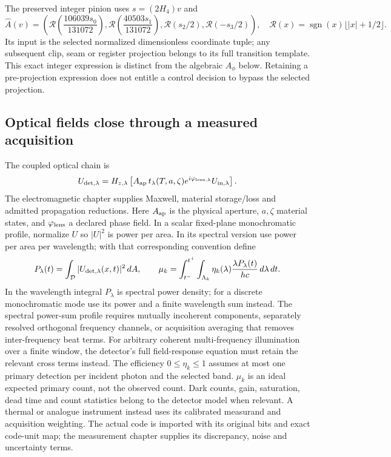 The preserved integer pinion uses $s=(2H_4)v$ and
\begin{equation}
 \widehat A(v)=\left(
 \mathcal R\!\left(\frac{106039s_0}{131072}\right),
 \mathcal R\!\left(\frac{40503s_1}{131072}\right),
 \mathcal R(s_2/2),\mathcal R(-s_3/2)\right),
 \quad \mathcal R(x)=\operatorname{sgn}(x)\lfloor|x|+1/2\rfloor.
 \label{eq:r14-integer-pinion}
\end{equation}
Its input is the selected normalized dimensionless coordinate tuple; any
subsequent clip, seam or register projection belongs to its full transition
template. This exact integer expression is distinct from the algebraic
$A_\phi$ below. Retaining a pre-projection expression does not entitle a control
decision to bypass the selected projection.

\subsection{Optical fields close through a measured acquisition}
\label{sec:r14-optical-observation}
The coupled optical chain is
\begin{equation}
 U_{\rm det,\lambda}=H_{z,\lambda}
 \left[A_{\rm ap}\,t_\lambda(T,a,\zeta)
 e^{i\varphi_{\rm lens,\lambda}}U_{\rm in,\lambda}\right].
 \label{eq:r14-optical-chain}
\end{equation}
The electromagnetic chapter supplies Maxwell, material storage/loss and
admitted propagation reductions. Here $A_{\rm ap}$ is the physical aperture,
$a,\zeta$ material states, and $\varphi_{\rm lens}$ a declared phase field.
In a scalar fixed-plane monochromatic profile, normalize $U$ so $|U|^2$ is
power per area. In its spectral version use power per area per wavelength;
with that corresponding convention define
\begin{equation}
 P_\lambda(t)=\int_{\mathcal D}|U_{\rm det,\lambda}(x,t)|^2\,dA,
 \qquad
 \mu_k=\int_{t^-}^{t^+}\int_{\Lambda_k}
 \eta_k(\lambda)\frac{\lambda P_\lambda(t)}{hc}\,d\lambda\,dt.
 \label{eq:r14-optical-acquisition}
\end{equation}
In the wavelength integral $P_\lambda$ is spectral power density; for a discrete
monochromatic mode use its power and a finite wavelength sum instead. The
spectral power-sum profile requires mutually incoherent components, separately
resolved orthogonal frequency channels, or acquisition averaging that removes
inter-frequency beat terms. For arbitrary coherent multi-frequency illumination
over a finite window, the detector's full field-response equation must retain
the relevant cross terms instead. The
efficiency $0\le\eta_k\le1$ assumes at most one primary detection per incident
photon and the selected band. $\mu_k$ is an ideal expected primary count, not
the observed count. Dark counts, gain, saturation, dead time and count
statistics belong to the detector model when relevant. A thermal or analogue
instrument instead uses its calibrated measurand and acquisition weighting.
The actual code is imported with its original bits and exact code-unit map;
the measurement chapter supplies its discrepancy, noise and uncertainty terms.

